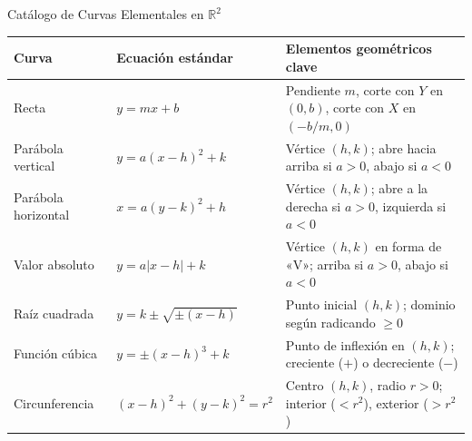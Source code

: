 \documentclass[aspectratio=169, 10pt]{beamer}
\begin{document}
\begin{frame}{Catálogo de Curvas Elementales en $\mathbb{R}^2$}
  \begin{table}
    \centering
    \setlength{\tabcolsep}{3pt}
    \renewcommand{\arraystretch}{1.05}
    \footnotesize
    \begin{tabular}{p{3.0cm} p{3.8cm} p{6.2cm}}
      \toprule
      \textbf{Curva} & \textbf{Ecuación estándar} & \textbf{Elementos geométricos clave} \\
      \midrule
      Recta & $y = mx + b$ & Pendiente $m$, corte con $Y$ en $(0,b)$, corte con $X$ en $(-b/m, 0)$ \\
      \addlinespace
      Parábola vertical & $y = a(x-h)^2 + k$ & Vértice $(h,k)$; abre hacia arriba si $a>0$, abajo si $a<0$ \\
      \addlinespace
      Parábola horizontal & $x = a(y-k)^2 + h$ & Vértice $(h,k)$; abre a la derecha si $a>0$, izquierda si $a<0$ \\
      \addlinespace
      Valor absoluto & $y = a|x-h| + k$ & Vértice $(h,k)$ en forma de «V»; arriba si $a>0$, abajo si $a<0$ \\
      \addlinespace
      Raíz cuadrada & $y = k \pm \sqrt{\pm(x-h)}$ & Punto inicial $(h,k)$; dominio según radicando $\ge 0$ \\
      \addlinespace
      Función cúbica & $y = \pm(x-h)^3 + k$ & Punto de inflexión en $(h,k)$; creciente ($+$) o decreciente ($-$) \\
      \addlinespace
      Circunferencia & $(x-h)^2 + (y-k)^2 = r^2$ & Centro $(h,k)$, radio $r>0$; interior ($<r^2$), exterior ($>r^2$) \\
      \bottomrule
    \end{tabular}
  \end{table}
\end{frame}
\end{document}
